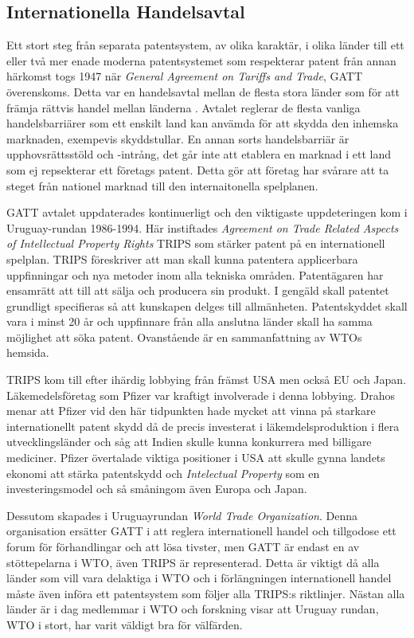 
\subsection{Internationella Handelsavtal}
Ett stort steg från separata patentsystem, av olika karaktär, i olika länder till ett eller två mer enade moderna patentsystemet som respekterar patent från annan härkomst togs 1947 när \emph{General Agreement on Tariffs and Trade}, GATT överenskoms. Detta var en handelsavtal mellan de flesta stora länder som för att främja rättvis handel mellan länderna \cite{gatt}. Avtalet reglerar de flesta vanliga handelsbarriärer som ett enskilt land kan anvämda för att skydda den inhemska marknaden, exempevis skyddstullar. En annan sorts handelsbarriär är upphovsrättsstöld och -intrång, det går inte att etablera en marknad i ett land som ej repsekterar ett företags patent. Detta gör att företag har svårare att ta steget från nationel marknad till den internaitonella spelplanen.

GATT avtalet uppdaterades kontinuerligt och den viktigaste uppdeteringen kom i Uruguay-rundan 1986-1994. Här instiftades \emph{Agreement on Trade Related Aspects of Intellectual Property Rights} TRIPS som stärker patent på en internationell spelplan. TRIPS föreskriver att man skall kunna patentera applicerbara uppfinningar och nya metoder inom alla tekniska områden. Patentägaren har ensamrätt att till att sälja och producera sin produkt. I gengäld skall patentet grundligt specifieras så att kunskapen delges till allmänheten. Patentskyddet skall vara  i minst 20 år och uppfinnare från alla anslutna länder skall ha samma möjlighet att söka patent. Ovanstående är en sammanfattning av WTOs hemsida\cite{wto}.

TRIPS kom till efter ihärdig lobbying från främst USA men också EU och Japan\cite{drahos}. Läkemedelsföretag som Pfizer var kraftigt involverade i denna lobbying\cite{drahos}. Drahos menar att Pfizer vid den här tidpunkten hade mycket att vinna på starkare internationellt patent skydd då de precis investerat i läkemdelsproduktion i flera utvecklingsländer och såg att Indien skulle kunna konkurrera med billigare mediciner\cite{drahos}. Pfizer övertalade viktiga positioner i USA att skulle gynna landets ekonomi att stärka patentskydd och \emph{Intelectual Property} som en investeringsmodel och så småningom även Europa och Japan\cite{drahos}.

Dessutom skapades i Uruguayrundan \emph{World Trade Organization}. Denna organisation ersätter GATT i att reglera internationell handel och tillgodose ett forum för förhandlingar och att lösa tivster, men GATT är endast en av stöttepelarna i WTO, även TRIPS är representerad. Detta är viktigt då alla länder som vill vara delaktiga i WTO och i förlängningen internationell handel måste även införa ett patentsystem som följer alla TRIPS:s riktlinjer. Nästan alla länder är i dag medlemmar i WTO och forskning visar att Uruguay rundan, WTO i stort, har varit väldigt bra för välfärden\cite{harrison}. 

